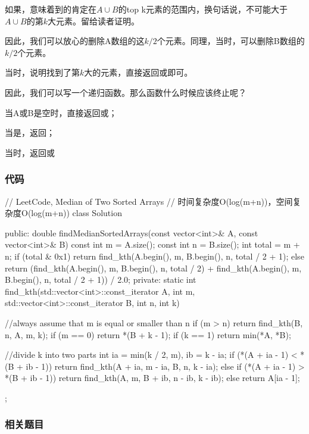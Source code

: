 如果，意味着到的肯定在$A \cup B$的top k元素的范围内，换句话说，不可能大于$A \cup B$的第$k$大元素。留给读者证明。

因此，我们可以放心的删除A数组的这$k/2$个元素。同理，当时，可以删除B数组的$k/2$个元素。

当时，说明找到了第$k$大的元素，直接返回或即可。

因此，我们可以写一个递归函数。那么函数什么时候应该终止呢？
\begindot
\item 当A或B是空时，直接返回或；
\item 当是，返回；
\item 当时，返回或
\myenddot


\subsubsection{代码}
\begin{Code}
// LeetCode, Median of Two Sorted Arrays
// 时间复杂度O(log(m+n))，空间复杂度O(log(m+n))
class Solution {
public:
    double findMedianSortedArrays(const vector<int>& A, const vector<int>& B) {
        const int m = A.size();
        const int n = B.size();
        int total = m + n;
        if (total & 0x1)
            return find_kth(A.begin(), m, B.begin(), n, total / 2 + 1);
        else
            return (find_kth(A.begin(), m, B.begin(), n, total / 2)
                    + find_kth(A.begin(), m, B.begin(), n, total / 2 + 1)) / 2.0;
    }
private:
    static int find_kth(std::vector<int>::const_iterator A, int m, 
            std::vector<int>::const_iterator B, int n, int k) {
        //always assume that m is equal or smaller than n
        if (m > n) return find_kth(B, n, A, m, k);
        if (m == 0) return *(B + k - 1);
        if (k == 1) return min(*A, *B);

        //divide k into two parts
        int ia = min(k / 2, m), ib = k - ia;
        if (*(A + ia - 1) < *(B + ib - 1))
            return find_kth(A + ia, m - ia, B, n, k - ia);
        else if (*(A + ia - 1) > *(B + ib - 1))
            return find_kth(A, m, B + ib, n - ib, k - ib);
        else
            return A[ia - 1];
    }
};
\end{Code}


\subsubsection{相关题目}

